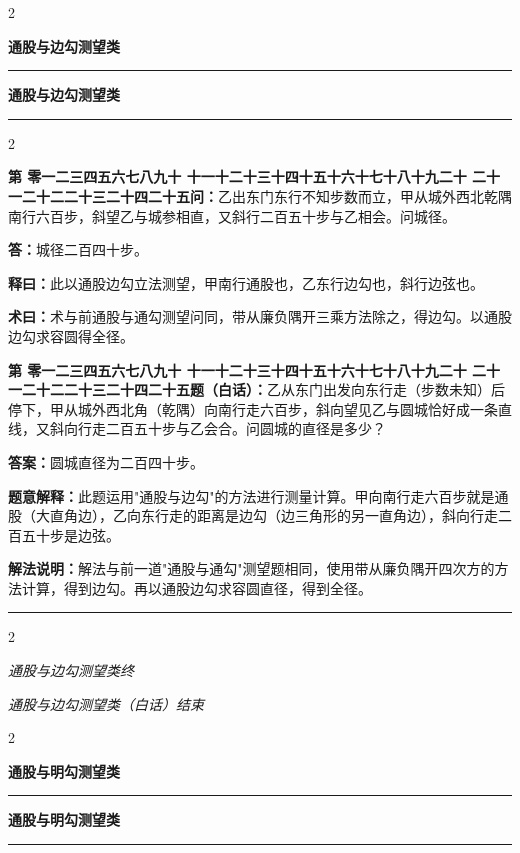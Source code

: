 \documentclass[10pt,a4paper]{article}
\newcommand{\longline}{\noindent\rule{\textwidth}{0.4pt}}
\newcounter{probnum}
\newcounter{probnumvol}[section]
\newcommand{\chnum}[1]{%
  \ifcase#1 零\or 一\or 二\or 三\or 四\or 五\or 六\or 七\or 八\or 九\or 十\or
    十一\or 十二\or 十三\or 十四\or 十五\or 十六\or 十七\or 十八\or 十九\or 二十\or
    二十一\or 二十二\or 二十三\or 二十四\or 二十五\fi}
\newcommand{\problemclassical}[1]{%
  \stepcounter{probnumvol}%
  \par\noindent
  \textcolor{classicalcolor}{\textbf{第\chnum{\value{probnumvol}}问：}}#1\par\smallskip
}
\newcommand{\problemmodern}[1]{%
  \par\noindent
  \textcolor{moderncolor}{\textbf{第\chnum{\value{probnumvol}}题（白话）：}}#1\par\smallskip
}
\newcommand{\answerclassical}[1]{%
  \par\noindent\textcolor{classicalcolor}{\textbf{答：}}#1\par
}
\newcommand{\answermodern}[1]{%
  \par\noindent\textcolor{moderncolor}{\textbf{答案：}}#1\par
}
\newcommand{\shiyiclassical}[1]{%
  \par\noindent\textcolor{classicalcolor}{\textbf{释曰：}}#1\par
}
\newcommand{\shiyimodern}[1]{%
  \par\noindent\textcolor{moderncolor}{\textbf{题意解释：}}#1\par
}
\newcommand{\shuyueclassical}[1]{%
  \par\noindent\textcolor{classicalcolor}{\textbf{术曰：}}#1\par
}
\newcommand{\shuyuemodern}[1]{%
  \par\noindent\textcolor{moderncolor}{\textbf{解法说明：}}#1\par
}
\newcommand{\volheaderclassical}[1]{%
  \begin{center}{\large\bfseries\color{volcolor} #1}\end{center}
  \vspace{0.3cm}
  \longline
  \vspace{0.3cm}
}
\newcommand{\volheadermodern}[1]{%
  \begin{center}{\large\bfseries\color{volcolor} #1}\end{center}
  \vspace{0.3cm}
  \longline
  \vspace{0.3cm}
}
\newcommand{\endclassical}[1]{%
  \vspace{0.3cm}
  \begin{center}\textit{#1}\end{center}
}
\newcommand{\endmodern}[1]{%
  \vspace{0.3cm}
  \begin{center}\textit{#1}\end{center}
}
\begin{document}
\begin{paracol}{2}

\volheaderclassical{通股与边勾测望类}

\switchcolumn

\volheadermodern{通股与边勾测望类}

\end{paracol}

\begin{paracol}{2}

\problemclassical{乙出东门东行不知步数而立，甲从城外西北乾隅南行六百步，斜望乙与城参相直，又斜行二百五十步与乙相会。问城径。}

\answerclassical{城径二百四十步。}

\shiyiclassical{此以通股边勾立法测望，甲南行通股也，乙东行边勾也，斜行边弦也。}

\shuyueclassical{术与前通股与通勾测望问同，带从廉负隅开三乘方法除之，得边勾。以通股边勾求容圆得全径。}

\switchcolumn

\problemmodern{乙从东门出发向东行走（步数未知）后停下，甲从城外西北角（乾隅）向南行走六百步，斜向望见乙与圆城恰好成一条直线，又斜向行走二百五十步与乙会合。问圆城的直径是多少？}

\answermodern{圆城直径为二百四十步。}

\shiyimodern{此题运用"通股与边勾"的方法进行测量计算。甲向南行走六百步就是通股（大直角边），乙向东行走的距离是边勾（边三角形的另一直角边），斜向行走二百五十步是边弦。}

\shuyuemodern{解法与前一道"通股与通勾"测望题相同，使用带从廉负隅开四次方的方法计算，得到边勾。再以通股边勾求容圆直径，得到全径。}

\end{paracol}

\vspace{0.5cm}
\longline
\begin{paracol}{2}
\endclassical{通股与边勾测望类终}
\switchcolumn
\endmodern{通股与边勾测望类（白话）结束}
\end{paracol}

\newpage

\setcounter{probnumvol}{0}

\begin{paracol}{2}

\volheaderclassical{通股与明勾测望类}

\switchcolumn

\volheadermodern{通股与明勾测望类}

\end{paracol}
\end{document}
